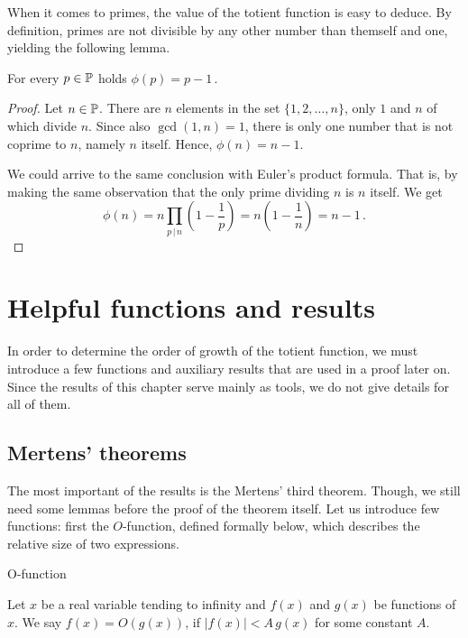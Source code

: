\documentclass{article}
\begin{document}
When it comes to primes, the value of the totient function is easy to deduce. By definition, primes are not divisible by any other number than themself and one, yielding the following lemma.

\begin{lemma}
\label{thm:phiprime}
For every $p \in \mathbb{P}$ holds $\phi(p) = p-1$\,.

\begin{proof}

Let $n\in\mathbb{P}$. There are $n$ elements in the set $\{1,2,\dots,n\}$, only $1$ and $n$ of which divide $n$. Since also $\gcd(1,n)=1$, there is only one number that is not coprime to $n$, namely $n$ itself. Hence, $\phi(n)=n-1$.

We could arrive to the same conclusion with Euler's product formula. That is, by making the same observation that the only prime dividing $n$ is $n$ itself. We get
\begin{equation*}
    \phi(n) = n \prod_{p \,\vert\, n} \left(1 - \frac{1}{p}\right) = n\left(1-\frac{1}{n}\right) = n-1\,.
\end{equation*}

\end{proof}

\end{lemma}

\section{Helpful functions and results}
\label{apujutut}

In order to determine the order of growth of the totient function, we must introduce a few functions and auxiliary results that are used in a proof later on. Since the results of this chapter serve mainly as tools, we do not give details for all of them.

\subsection{Mertens' theorems}

The most important of the results is the Mertens' third theorem. Though, we still need some lemmas before the proof of the theorem itself. Let us introduce few functions: first the $O$-function, defined formally below, which describes the relative size of two expressions.

\begin{definition}
O-function

Let $x$ be a real variable tending to infinity and $f(x)$ and $g(x)$ be functions of $x$. We say $f(x)=O(g(x))$, if $\vert f(x) \vert < A\,g(x)$ for some constant $A$.
\end{definition}
\end{document}
